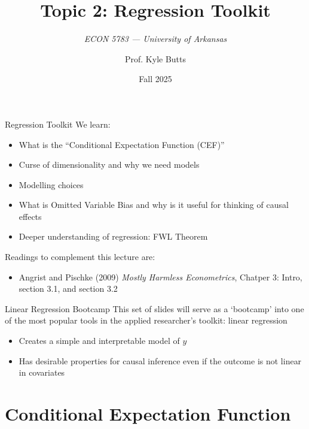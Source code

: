 \documentclass[aspectratio=169,t,11pt,table]{beamer}
\title{Topic 2: Regression Toolkit}
\subtitle{\it  ECON 5783 — University of Arkansas}
\date{Fall 2025}
\author{Prof. Kyle Butts}
\begin{document}
\begin{frame}
\maketitle

\end{frame}

\begin{frame}{Regression Toolkit}
  We learn:
  \begin{itemize}
    \item What is the ``Conditional Expectation Function (CEF)''
    \item Curse of dimensionality and why we need models
    \item Modelling choices
    \item What is Omitted Variable Bias and why is it useful for thinking of causal effects
    \item Deeper understanding of regression: FWL Theorem
  \end{itemize}

  \bigskip
  Readings to complement this lecture are:
  \begin{itemize}
    \item Angrist and Pischke (2009) \emph{Mostly Harmless Econometrics}, Chatper 3: Intro, section 3.1, and section 3.2 
  \end{itemize}
\end{frame}

\begin{frame}{Linear Regression Bootcamp}
  This set of slides will serve as a `bootcamp' into one of the most popular tools in the applied researcher's toolkit: linear regression
  \begin{itemize}
    \item Creates a simple and interpretable model of $y$
    
    \item Has desirable properties for causal inference even if the outcome is not linear in covariates
  \end{itemize}
\end{frame}

\section{Conditional Expectation Function}
\end{document}
